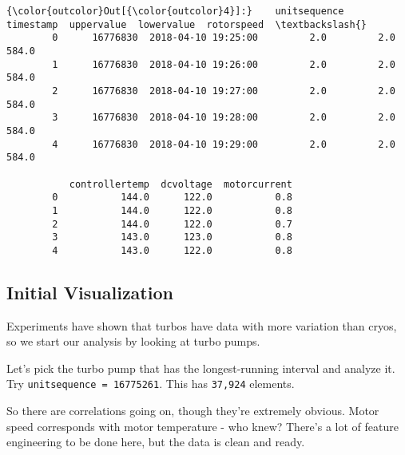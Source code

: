 \documentclass[11pt]{article}
\begin{document}
\begin{Verbatim}[commandchars=\\\{\}]
{\color{outcolor}Out[{\color{outcolor}4}]:}    unitsequence            timestamp  uppervalue  lowervalue  rotorspeed  \textbackslash{}
        0      16776830  2018-04-10 19:25:00         2.0         2.0       584.0   
        1      16776830  2018-04-10 19:26:00         2.0         2.0       584.0   
        2      16776830  2018-04-10 19:27:00         2.0         2.0       584.0   
        3      16776830  2018-04-10 19:28:00         2.0         2.0       584.0   
        4      16776830  2018-04-10 19:29:00         2.0         2.0       584.0   
        
           controllertemp  dcvoltage  motorcurrent  
        0           144.0      122.0           0.8  
        1           144.0      122.0           0.8  
        2           144.0      122.0           0.7  
        3           143.0      123.0           0.8  
        4           143.0      122.0           0.8  
\end{Verbatim}
            
    \subsection{Initial Visualization}\label{initial-visualization}

Experiments have shown that turbos have data with more variation than
cryos, so we start our analysis by looking at turbo pumps.

Let's pick the turbo pump that has the longest-running interval and
analyze it.\\
Try \texttt{unitsequence\ =\ 16775261}. This has \texttt{37,924}
elements.

So there are correlations going on, though they're extremely obvious.
Motor speed corresponds with motor temperature - who knew? There's a lot
of feature engineering to be done here, but the data is clean and ready.
\end{document}
